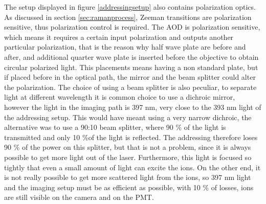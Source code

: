 The setup displayed in figure \ref{addressingsetup} also contains polarization optics. As discussed in section \ref{sec:ramanprocess}, Zeeman transitions are polarization sensitive, thus polarization control is required. The AOD is polarization sensitive, which means it requires a certain input polarization and outputs another particular polarization, that is the reason why half wave plate are before and after, and additional quarter wave plate is inserted before the objective to obtain circular polarized light. This placements means having a non standard plate, but if placed before in the optical path, the mirror and the beam splitter could alter the polarization. The choice of using a beam splitter is also peculiar, to separate light at different wavelength it is common choice to use a dichroic mirror, however the light in the imaging path is 397 nm, very close to the 393 nm light of the addressing setup. This would have meant using a very narrow dichroic, the alternative was to use a 90:10 beam splitter, where 90 \% of the light is transmitted and only 10 \%of the light is reflected. The addressing therefore loses 90 \% of the power on this splitter, but that is not a problem, since it is always possible to get more light out of the laser. Furthermore, this light is focused so tightly that even a small amount of light can excite the ions. On the other end, it is not really possible to get more scattered light from the ions, so 397 nm light and the imaging setup must be as efficient as possible, with 10 \% of losses, ions are still visible on the camera and on the PMT.


